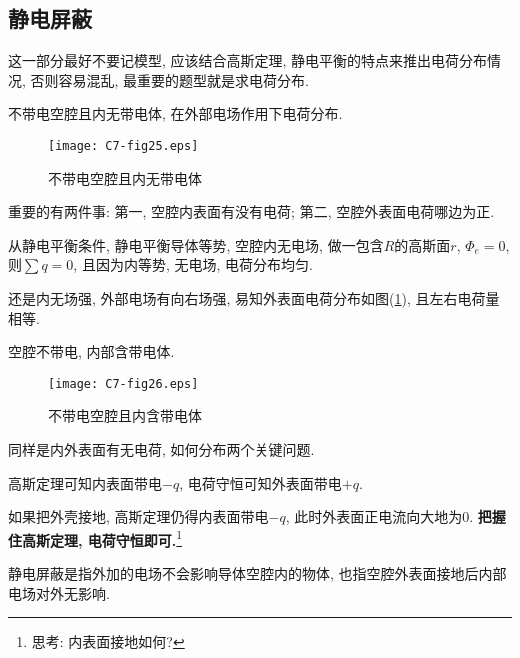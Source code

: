 \subsection{静电屏蔽}

这一部分最好不要记模型, 应该结合高斯定理, 静电平衡的特点来推出电荷分布情况, 否则容易混乱, 最重要的题型就是求电荷分布. 
\begin{example}
	不带电空腔且内无带电体, 在外部电场作用下电荷分布.
	
	\begin{figure}[H]
		\centering
		\texttt{[image: C7-fig25.eps]}
		\caption{不带电空腔且内无带电体}
		\label{C7-fig25}
	\end{figure}
	
	\begin{solution}
		
		重要的有两件事: 第一, 空腔内表面有没有电荷; 第二, 空腔外表面电荷哪边为正. 
		
		从静电平衡条件, 静电平衡导体等势, 空腔内无电场, 做一包含$R$的高斯面$r$, $\varPhi_e = 0$, 则$\sum q = 0$, 且因为内等势, 无电场, 电荷分布均匀. 
		
		还是内无场强, 外部电场有向右场强, 易知外表面电荷分布如图(\ref{C7-fig25}), 且左右电荷量相等.
	\end{solution}
	
\end{example}

\newpage

\begin{example}
	空腔不带电, 内部含带电体. 
	
	\begin{figure}[H]
		\centering
		\texttt{[image: C7-fig26.eps]}
		\caption{不带电空腔且内含带电体}
	\end{figure}
	
	\begin{solution}
		
		同样是内外表面有无电荷, 如何分布两个关键问题. 
		
		高斯定理可知内表面带电$-q$, 电荷守恒可知外表面带电$+q$. 
		
		如果把外壳接地, 高斯定理仍得内表面带电$-q$, 此时外表面正电流向大地为0. \textbf{把握住高斯定理, 电荷守恒即可.}\footnote{思考: 内表面接地如何? }
		
	\end{solution}
\end{example}

静电屏蔽是指外加的电场不会影响导体空腔内的物体, 也指空腔外表面接地后内部电场对外无影响. 

